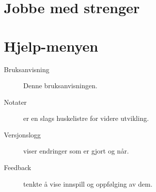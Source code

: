 \documentclass[a4paper,norsk,11pt]{article}
\begin{document}
\section{Jobbe med strenger}

\section{Hjelp-menyen}
\begin{description}
 \item[Bruksanvisning] Denne bruksanvisningen.
 \item[Notater] er en slags huskelistre for videre utvikling.
 \item[Versjonslogg] viser endringer som er gjort og når.
 \item[Feedback] tenkte å vise innspill og oppfølging av dem.
\end{description}
\end{document}
